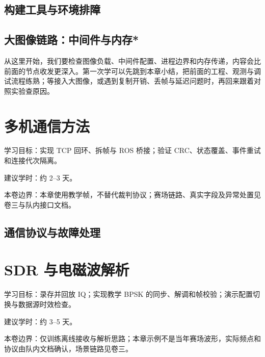 \documentclass[
  lang=cn,
  scheme=chinese,
  chinesefont=ctexfont,
  11pt,
  oneside,
  device=normal,
  color=cyan,
  mode=fancy
]{elegantbook}
\begin{document}
\section{构建工具与环境排障}


\section{大图像链路：中间件与内存*}
\label{sec:ros2-image-advanced}
\begin{note}
从这里开始，我们要检查图像负载、中间件配置、进程边界和内存传递，内容会比前面的节点收发更深入。第一次学可以先跳到本章小结，把前面的工程、观测与调试流程练熟；等接入大图像，或遇到复制开销、丢帧与延迟问题时，再回来跟着对照实验查原因。
\end{note}




\chapter{多机通信方法}

\begin{introduction}
  \item 学习目标：实现 TCP 回环、拆帧与 ROS 桥接；验证 CRC、状态覆盖、事件重试和连接代次隔离。
  \item 建议学时：约 2--3 天。
  \item 本卷边界：本章使用教学帧，不替代裁判协议；赛场链路、真实字段及异常处置见卷三与队内接口文档。
\end{introduction}

\section{通信协议与故障处理}





\chapter{SDR 与电磁波解析}

\begin{introduction}
  \item 学习目标：录存并回放 IQ；实现教学 BPSK 的同步、解调和帧校验；演示配置切换与数据源时效检查。
  \item 建议学时：约 3--5 天。
  \item 本卷边界：仅训练离线接收与解析思路；本章示例不是当年赛场波形，实际频点和协议由队内文档确认，场景链路见卷三。
\end{introduction}
\end{document}
